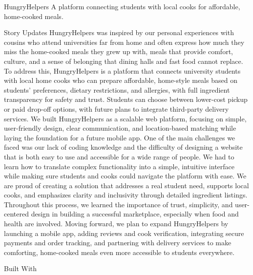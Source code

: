 HungryHelpers
A platform connecting students with local cooks for affordable, home-cooked meals.

Story
Updates
HungryHelpers was inspired by our personal experiences with cousins who attend universities far from home and often express how much they miss the home-cooked meals they grew up with, meals that provide comfort, culture, and a sense of belonging that dining halls and fast food cannot replace. To address this, HungryHelpers is a platform that connects university students with local home cooks who can prepare affordable, home-style meals based on students’ preferences, dietary restrictions, and allergies, with full ingredient transparency for safety and trust. Students can choose between lower-cost pickup or paid drop-off options, with future plans to integrate third-party delivery services. We built HungryHelpers as a scalable web platform, focusing on simple, user-friendly design, clear communication, and location-based matching while laying the foundation for a future mobile app. One of the main challenges we faced was our lack of coding knowledge and the difficulty of designing a website that is both easy to use and accessible for a wide range of people. We had to learn how to translate complex functionality into a simple, intuitive interface while making sure students and cooks could navigate the platform with ease. We are proud of creating a solution that addresses a real student need, supports local cooks, and emphasizes clarity and inclusivity through detailed ingredient listings. Throughout this process, we learned the importance of trust, simplicity, and user-centered design in building a successful marketplace, especially when food and health are involved. Moving forward, we plan to expand HungryHelpers by launching a mobile app, adding reviews and cook verification, integrating secure payments and order tracking, and partnering with delivery services to make comforting, home-cooked meals even more accessible to students everywhere.

Built With
